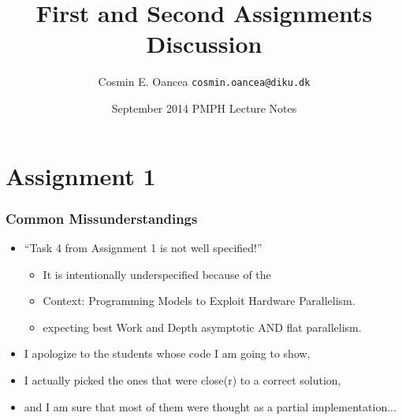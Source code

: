 \documentclass{beamer}
\title[Assignments]{First and Second Assignments Discussion}
\author[C.~Oancea]{Cosmin E. Oancea {\tt cosmin.oancea@diku.dk}}
\institute{Department of Computer Science (DIKU)\\University of Copenhagen}
\date[Sept 2014]{September 2014 PMPH Lecture Notes}
\newcommand{\emp}[1]{\textcolor{DikuRed}{ #1}}
\begin{document}
\titleslide


\section{Assignment 1}

\begin{frame}[fragile]
	\tableofcontents[currentsection]
\end{frame}


\begin{frame}[fragile,t]
\frametitle{Common Missunderstandings}

\begin{itemize}
    \item ``Task 4 from Assignment 1 is not well specified!''\\\pause
        \begin{itemize}
            \item It is intentionally underspecified because of the
            \item Context: Programming Models to Exploit Hardware Parallelism. 
            \item expecting \emp{best Work and Depth asymptotic AND flat parallelism.}  
        \end  {itemize}\medskip
    \item I apologize to the students whose code I am going to show,
    \item I actually picked the ones that were close(r) to a correct solution,
    \item and I am sure that most of them were thought as a partial implementation...


\end  {itemize}
\end{frame}
\end{document}
